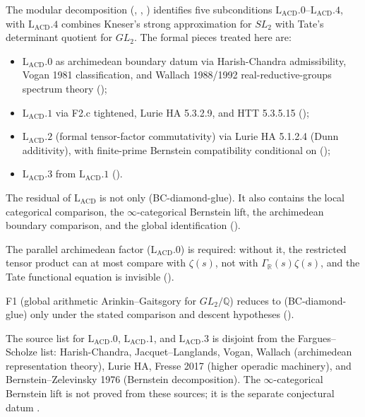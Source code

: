 The modular decomposition (,
, ) identifies
five subconditions
\(\mathrm{L}_{\mathrm{ACD}}.0\)--\(\mathrm{L}_{\mathrm{ACD}}.4\), with
\(\mathrm{L}_{\mathrm{ACD}}.4\) combines Kneser's strong approximation
for \(SL_{2}\) with Tate's determinant quotient for \(GL_{2}\). The
formal pieces treated here are:
\begin{itemize}
\item \(\mathrm{L}_{\mathrm{ACD}}.0\) as archimedean boundary datum via Harish-Chandra admissibility,
Vogan 1981 classification, and Wallach 1988/1992 real-reductive-groups
spectrum theory ();
\item \(\mathrm{L}_{\mathrm{ACD}}.1\) via F2.c tightened, Lurie HA
5.3.2.9, and HTT 5.3.5.15
();
\item \(\mathrm{L}_{\mathrm{ACD}}.2\) (formal tensor-factor commutativity)
via Lurie HA 5.1.2.4 (Dunn additivity), with finite-prime Bernstein
compatibility conditional on 
();
\item \(\mathrm{L}_{\mathrm{ACD}}.3\) from \(\mathrm{L}_{\mathrm{ACD}}.1\)
().
\end{itemize}
The residual of \(\mathrm{L}_{\mathrm{ACD}}\) is not only
(BC-diamond-glue). It also contains the local categorical comparison,
the \(\infty\)-categorical Bernstein lift, the archimedean boundary
comparison, and the global identification
().

The parallel archimedean factor
(\(\mathrm{L}_{\mathrm{ACD}}.0\)) is required: without it, the
restricted tensor product can at most compare with \(\zeta(s)\), not
with \(\Gamma_{\mathbb{R}}(s)\zeta(s)\), and the Tate functional
equation is invisible
().

F1 (global arithmetic Arinkin--Gaitsgory for \(GL_{2}/\mathbb{Q}\))
reduces to (BC-diamond-glue) only under the stated comparison and
descent hypotheses
().

The source list for \(\mathrm{L}_{\mathrm{ACD}}.0\),
\(\mathrm{L}_{\mathrm{ACD}}.1\), and \(\mathrm{L}_{\mathrm{ACD}}.3\) is
disjoint from the Fargues--Scholze list: Harish-Chandra,
Jacquet--Langlands, Vogan, Wallach (archimedean representation
theory), Lurie HA, Fresse 2017 (higher operadic machinery), and
Bernstein--Zelevinsky 1976 (Bernstein decomposition). The
\(\infty\)-categorical Bernstein lift is not proved from these sources;
it is the separate conjectural datum
.
